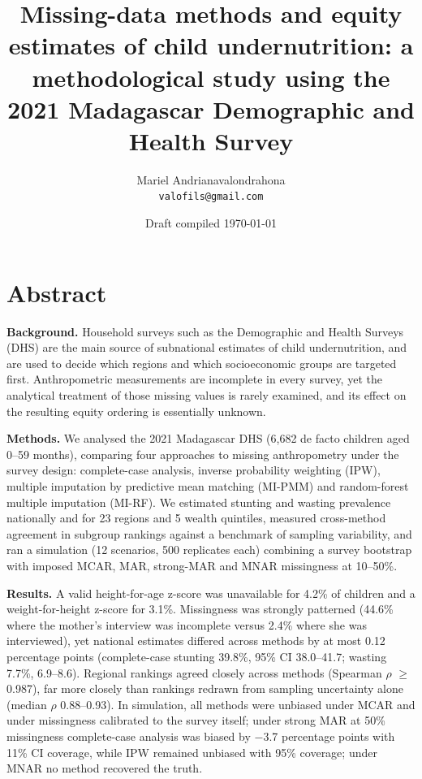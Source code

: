\documentclass[11pt,a4paper]{article}
\title{Missing-data methods and equity estimates of child undernutrition: a methodological study using the 2021 Madagascar Demographic and Health Survey}
\author{Mariel Andrianavalondrahona\\[2pt]\small\texttt{valofils@gmail.com}}
\date{Draft compiled \today}
\begin{document}
\linenumbers
\maketitle

\section{Abstract}\label{abstract}

\textbf{Background.} Household surveys such as the Demographic and
Health Surveys (DHS) are the main source of subnational estimates of
child undernutrition, and are used to decide which regions and which
socioeconomic groups are targeted first. Anthropometric measurements are
incomplete in every survey, yet the analytical treatment of those
missing values is rarely examined, and its effect on the resulting
equity ordering is essentially unknown.

\textbf{Methods.} We analysed the 2021 Madagascar DHS (6,682 de facto
children aged 0--59 months), comparing four approaches to missing
anthropometry under the survey design: complete-case analysis, inverse
probability weighting (IPW), multiple imputation by predictive mean
matching (MI-PMM) and random-forest multiple imputation (MI-RF). We
estimated stunting and wasting prevalence nationally and for 23 regions
and 5 wealth quintiles, measured cross-method agreement in subgroup
rankings against a benchmark of sampling variability, and ran a
simulation (12 scenarios, 500 replicates each) combining a survey
bootstrap with imposed MCAR, MAR, strong-MAR and MNAR missingness at
10--50\%.

\textbf{Results.} A valid height-for-age z-score was unavailable for
4.2\% of children and a weight-for-height z-score for 3.1\%. Missingness
was strongly patterned (44.6\% where the mother's interview was
incomplete versus 2.4\% where she was interviewed), yet national
estimates differed across methods by at most 0.12 percentage points
(complete-case stunting 39.8\%, 95\% CI 38.0--41.7; wasting 7.7\%,
6.9--8.6). Regional rankings agreed closely across methods (Spearman $\rho$ $\ge$
0.987), far more closely than rankings redrawn from sampling uncertainty
alone (median $\rho$ 0.88--0.93). In simulation, all methods were unbiased
under MCAR and under missingness calibrated to the survey itself; under
strong MAR at 50\% missingness complete-case analysis was biased by $-$3.7
percentage points with 11\% CI coverage, while IPW remained unbiased
with 95\% coverage; under MNAR no method recovered the truth.
\end{document}
